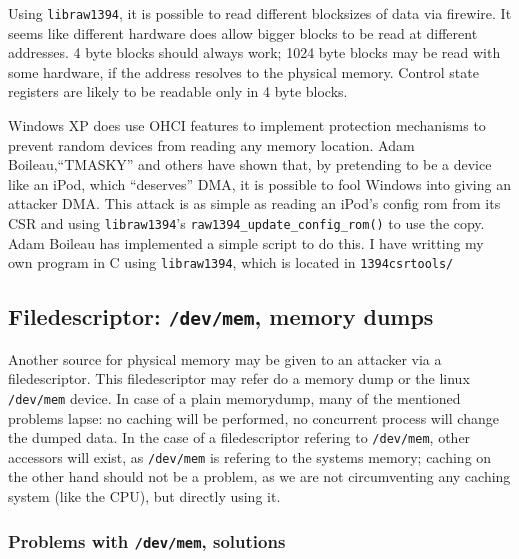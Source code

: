 Using \texttt{libraw1394}, it is possible to read different blocksizes of data
via firewire.  It seems like different hardware does allow bigger blocks to be
read at different addresses. 4 byte blocks should always work; 1024 byte blocks
may be read with some hardware, if the address resolves to the physical memory.
Control state registers are likely to be readable only in 4 byte blocks.

\label{windows-dma} Windows XP does use OHCI features to implement protection
mechanisms to prevent random devices from reading any memory location.  Adam
Boileau,``TMASKY'' and others have shown \cite{rux2k6firewire:2006} that, by
pretending to be a device like an iPod, which ``deserves'' DMA, it is possible
to fool Windows into giving an attacker DMA.  This attack is as simple as
reading an iPod's config rom from its CSR and using \texttt{libraw1394}'s
\texttt{raw1394\_update\_config\_rom()} to use the copy.  Adam Boileau has
implemented a simple script to do this. I have writting my own program in C
using \texttt{libraw1394}, which is located in \texttt{1394csrtools/}



\subsection{Filedescriptor: \texttt{/dev/mem}, memory dumps}

Another source for physical memory may be given to an attacker via a
filedescriptor. This filedescriptor may refer do a memory dump or the linux
\texttt{/dev/mem} device. In case of a plain memorydump, many of the mentioned
problems lapse: no caching will be performed, no concurrent process will change
the dumped data. In the case of a filedescriptor refering to \texttt{/dev/mem},
other accessors will exist, as \texttt{/dev/mem} is refering to the systems
memory; caching on the other hand should not be a problem, as we are not
circumventing any caching system (like the CPU), but directly using it.

\subsubsection{Problems with \texttt{/dev/mem}, solutions}

